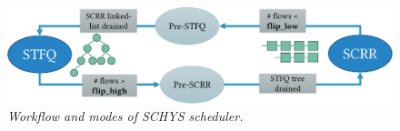 \begin{figure}[t]
    \centering
    \includegraphics[width=0.99\linewidth]{figs/hybrid_sm-crop.pdf}
    \vspace{-2mm}
    \caption{\small{\textit{Workflow and modes of SCHYS scheduler.}}}
	\label{fig:hybrid-flow}
 \vspace{-4mm}
\end{figure}

